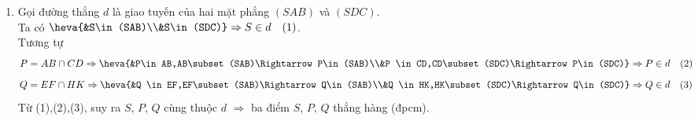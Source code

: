 \begin{bt}
{\begin{enumerate}
			$$M=AD\cap BC \Rightarrow \heva{&M\in AD,AD\subset (SAD)\Rightarrow M\in(SAD)\\&M \in BC,BC\subset (SBC)\Rightarrow M\in(SBC)}\Rightarrow M\in d\quad (2)$$
			$$N=EK\cap FH \Rightarrow \heva{&N \in EK,EK\subset (SAD)\Rightarrow N\in(SAD)\\&N \in FH,FH\subset (SBC)\Rightarrow N\in(SBC)}\Rightarrow N\in d\quad (3)$$
			Từ (1),(2),(3), suy ra $S$, $M$, $N$ cùng thuộc $d$ $\Rightarrow$ ba điểm $S$, $M$, $N$ thẳng hàng (đpcm).
			\item Gọi đường thẳng $d$ là giao tuyến của hai mặt phẳng $(SAB)$ và $(SDC)$.\\
			Ta có 
			$\heva{&S\in(SAB)\\&S\in(SDC)}\Rightarrow S\in d\quad (1)$.\\
			Tương tự
			$$P=AB\cap CD \Rightarrow \heva{&P\in AB,AB\subset (SAB)\Rightarrow P\in(SAB)\\&P \in CD,CD\subset (SDC)\Rightarrow P\in(SDC)}\Rightarrow P\in d\quad (2)$$
			$$Q=EF\cap HK \Rightarrow \heva{&Q \in EF,EF\subset (SAB)\Rightarrow Q\in(SAB)\\&Q \in HK,HK\subset (SDC)\Rightarrow Q\in(SDC)}\Rightarrow Q\in d\quad (3)$$
			Từ (1),(2),(3), suy ra $S$, $P$, $Q$ cùng thuộc $d$ $\Rightarrow$ ba điểm $S$, $P$, $Q$ thẳng hàng (đpcm).
		\end{enumerate}	
	}
\end{bt}

